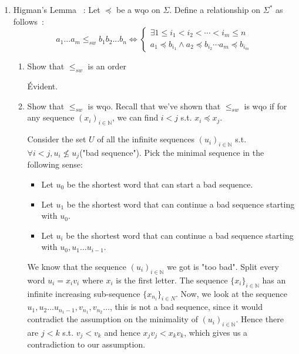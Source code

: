 \documentclass[a4paper,11pt]{exam}
\newcommand{\N}{\mathbb{N}}
\begin{document}
\begin{questions}
\begin{enumerate}
\begin{solution}
			\end{solution}
			
			\item Higman's Lemma ~:
			Let $\preccurlyeq$ be a wqo on $\Sigma$.
			Define a relationship on $\Sigma^*$ as follows~:
			\[
			a_1...a_m \leq_{sw} b_1b_2...b_n \Leftrightarrow \left\{
			\begin{array}{l}
			\exists 1\leq i_1 < i_2 <\cdots < i_m \leq n \\
			a_1\preccurlyeq b_{i_1} \wedge a_2\preccurlyeq b_{i_2} \cdots
			a_m\preccurlyeq b_{i_m}
			\end{array}
			\right.
			\]
			
			\begin{enumerate}
				\item Show that $\leq_{sw}$ is an order %
				
				\begin{solution}
					Évident.
				\end{solution}
				
				\item Show that $\leq_{sw}$ is wqo. Recall that we've shown that $\leq_{sw}$ is wqo if for any sequence $(x_i)_{i\in\N}$, we can find $i<j$ s.t. $x_i\preccurlyeq x_j$.
				
				\begin{solution}
					Consider the set $U$ of all the infinite sequences $(u_i)_{i\in\N}$ s.t.
					$\forall i<j, u_i \not\leq u_j$("bad sequence"). Pick the minimal sequence in the following sense: 
					\begin{itemize}
						\item Let $u_0$ be the shortest word that can start a bad sequence.
						\item Let $u_1$ be the shortest word that can continue a bad sequence starting with $u_0$.
						\item Let $u_i$ be the shortest word that can continue a bad sequence starting with $u_0,u_1\ldots u_{i-1}$.
					\end{itemize}
					We know that the sequence $(u_i)_{i\in\N}$ we got is "too bad".  Split every word $u_i=x_iv_i$ where $x_i$ is the first letter. The sequence $\{x_i\}_{i\in \N}$ has an infinite increasing sub-sequence $\{x_{n_i}\}_{i\in N}$. Now, we look at the sequence $u_1,u_2\ldots u_{n_1 -1}, v_{n_1},v_{n_2}\ldots$, this is not a bad sequence, since it would contradict the assumption on the minimality of $(u_i)_{i\in\N}$. Hence there are $j<k$ s.t. $v_j<v_k$ and hence $ x_j v_j<x_k v_k$, which gives us a contradiction to our assumption.
					

\end{solution}
\end{enumerate}
\end{enumerate}
\end{questions}
\end{document}
